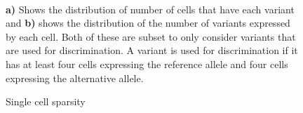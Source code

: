 \begin{figure}[th!]
\caption{Single cell sparsity}
\label{figure:scdatafigure}
\begin{centering}
\\
\par{\textbf{a)} Shows the distribution of number of cells that have each variant and \textbf{b)} shows the distribution of the number of variants expressed by each cell. Both of these are subset to only consider variants that are used for discrimination. A variant is used for discrimination if it has at least four cells expressing the reference allele and four cells expressing the alternative allele.}
\end{centering}
\end{figure}

